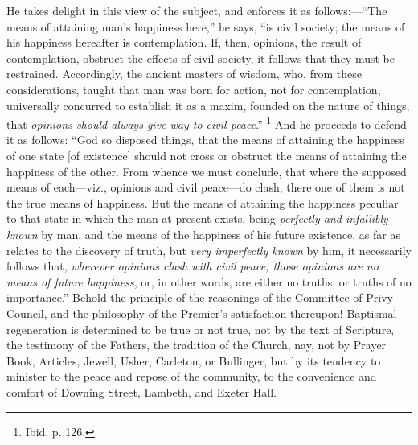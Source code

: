He takes delight in this view of the subject, and enforces it as
follows:—``The means of attaining man's happiness here,'' he
says, ``is civil society; the means of his happiness hereafter is
contemplation. If, then, opinions, the result of contemplation,
obstruct the effects of civil society, it follows that they must be
restrained. Accordingly, the ancient masters of wisdom, who, from
these considerations, taught that man was born for action, not for
contemplation, universally concurred to establish it as a maxim,
founded on the nature of things, that \emph{opinions should always give
way to civil peace}.'' \footnote{Ibid. p. 126.}
And he proceeds to defend it as follows: ``God so disposed things,
that the means of attaining the happiness of one state [of existence]
should not cross or obstruct the means of attaining the happiness of
the other. From whence we must conclude, that where the supposed means
of each—viz., opinions and civil peace—do clash, there one of them
is not the true means of happiness. But the means of attaining the
happiness peculiar to that state in which the man at present exists,
being \emph{perfectly and infallibly known} by man, and the means of
the happiness of his future existence, as far as relates to the
discovery of truth, but \emph{very imperfectly known} by him, it
necessarily follows that, \emph{wherever opinions clash with civil peace,
those opinions are no means of future happiness}, or, in other
words, are either no truths, or truths of no importance.'' Behold
the principle of the reasonings of the Committee of Privy Council, and
the philosophy of the Premier's satisfaction thereupon! Baptismal
regeneration is determined to be true or not true, not by the text of
Scripture, the testimony of the Fathers, the tradition of the Church,
nay, not by Prayer Book, Articles, Jewell, Usher, Carleton, or
Bullinger, but by its tendency to minister to the peace and repose of
the community, to the convenience and comfort of Downing Street,
Lambeth, and Exeter Hall.

